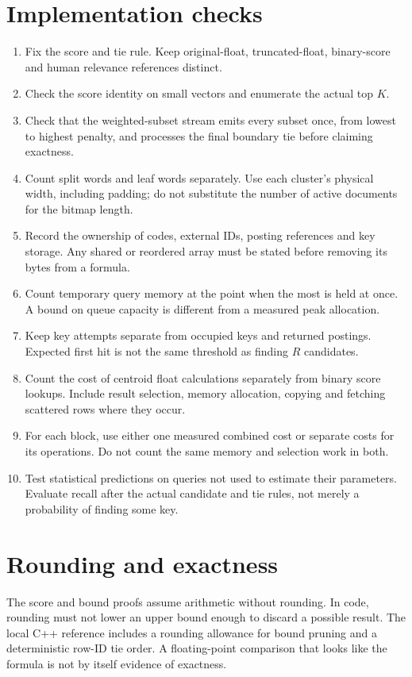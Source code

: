 \section{Implementation checks}
\begin{enumerate}
\item Fix the score and tie rule. Keep original-float, truncated-float, binary-score and human
relevance references distinct.
\item Check the score identity on small vectors and enumerate the actual top $K$.
\item Check that the weighted-subset stream emits every subset once, from lowest to highest penalty,
and processes the final boundary tie before claiming exactness.
\item Count split words and leaf words separately. Use each cluster's physical width, including
padding; do not substitute the number of active documents for the bitmap length.
\item Record the ownership of codes, external IDs, posting references and key storage. Any
shared or reordered array must be stated before removing its bytes from a formula.
\item Count temporary query memory at the point when the most is held at once. A bound on
queue capacity is different from a measured peak allocation.
\item Keep key attempts separate from occupied keys and returned postings. Expected first hit
is not the same threshold as finding $R$ candidates.
\item Count the cost of centroid float calculations separately from binary score lookups. Include
result selection, memory allocation, copying and fetching scattered rows where they occur.
\item For each block, use either one measured combined cost or separate costs for its operations.
Do not count the same memory and selection work in both.
\item Test statistical predictions on queries not used to estimate their parameters. Evaluate
recall after the actual candidate and tie rules, not merely a probability of finding some key.
\end{enumerate}

\section{Rounding and exactness}
The score and bound proofs assume arithmetic without rounding. In code, rounding must
not lower an upper bound enough to discard a possible result. The local C++ reference includes a
rounding allowance for bound pruning and a deterministic row-ID tie order. A floating-point comparison that looks like the formula is not by itself evidence of exactness.

